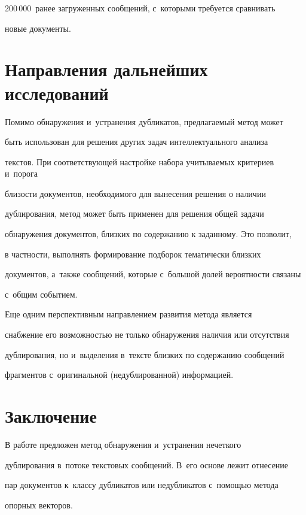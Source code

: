 200\,000~ранее загруженных сообщений, с~которыми требуется сравнивать

новые документы.



\section{Направления дальнейших исследований}



  Помимо обнаружения и~устранения дубликатов, предлагаемый метод может

быть использован для решения других задач интеллектуального анализа

текстов. При соответствующей настройке набора учитываемых критериев и~порога

бли\-зости документов, необходимого для вынесения решения о наличии

дублирования, метод может быть применен для решения общей задачи

обнаружения документов, близ\-ких по содержанию к заданному. Это позволит,

в частности, выполнять формирование подборок тематически близких

документов, а~также сообщений, которые с~большой долей вероятности связаны

с~общим событием.



  Еще одним перспективным направлением развития метода является

снабжение его возможностью не только обнаружения наличия или отсутствия

дублирования, но и~выделения в~тексте близких по содержанию сообщений

фрагментов с~оригинальной (недублированной) информацией.



\section{Заключение}



  В работе предложен метод обнаружения и~устранения нечеткого

дублирования в~потоке текстовых сообщений. В~его основе лежит отнесение

пар документов к~классу дубликатов или недубликатов с~помощью метода

опорных векторов.



